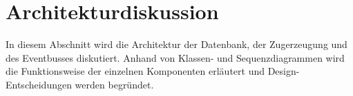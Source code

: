\section{Architekturdiskussion}

In diesem Abschnitt wird die Architektur der Datenbank, der Zugerzeugung und des Eventbusses diskutiert. Anhand von Klassen- und Sequenzdiagrammen wird die Funktionsweise der einzelnen Komponenten erläutert und Design-Entscheidungen werden begründet.





